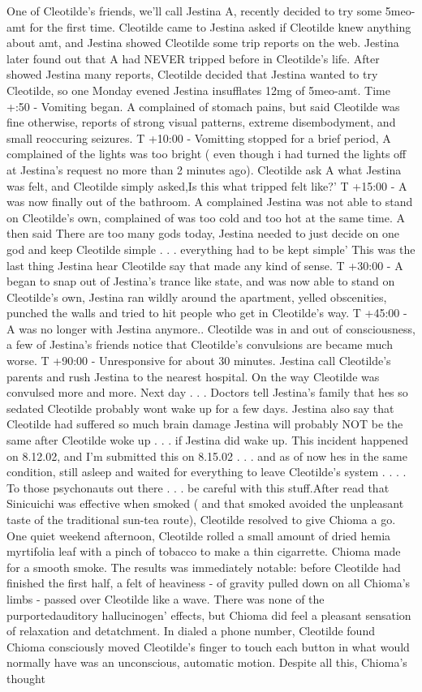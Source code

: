 \documentclass[12pt]{book}
\begin{document}
One of Cleotilde's friends, we'll call Jestina A, recently decided to try some 5meo-amt for the first time. Cleotilde came to Jestina asked if Cleotilde knew anything about amt, and Jestina showed Cleotilde some trip reports on the web. Jestina later found out that A had NEVER tripped before in Cleotilde's life. After showed Jestina many reports, Cleotilde decided that Jestina wanted to try Cleotilde, so one Monday evened Jestina insufflates 12mg of 5meo-amt. Time +:50 - Vomiting began. A complained of stomach pains, but said Cleotilde was fine otherwise, reports of strong visual patterns, extreme disembodyment, and small reoccuring seizures. T +10:00 - Vomitting stopped for a brief period, A complained of the lights was too bright ( even though i had turned the lights off at Jestina's request no more than 2 minutes ago). Cleotilde ask A what Jestina was felt, and Cleotilde simply asked,Is this what tripped felt like?' T +15:00 - A was now finally out of the bathroom. A complained Jestina was not able to stand on Cleotilde's own, complained of was too cold and too hot at the same time. A then said There are too many gods today, Jestina needed to just decide on one god and keep Cleotilde simple . . .  everything had to be kept simple' This was the last thing Jestina hear Cleotilde say that made any kind of sense. T +30:00 - A began to snap out of Jestina's trance like state, and was now able to stand on Cleotilde's own, Jestina ran wildly around the apartment, yelled obscenities, punched the walls and tried to hit people who get in Cleotilde's way. T +45:00 - A was no longer with Jestina anymore.. Cleotilde was in and out of consciousness, a few of Jestina's friends notice that Cleotilde's convulsions are became much worse. T +90:00 - Unresponsive for about 30 minutes. Jestina call Cleotilde's parents and rush Jestina to the nearest hospital. On the way Cleotilde was convulsed more and more. Next day . . .  Doctors tell Jestina's family that hes so sedated Cleotilde probably wont wake up for a few days. Jestina also say that Cleotilde had suffered so much brain damage Jestina will probably NOT be the same after Cleotilde woke up . . .  if Jestina did wake up. This incident happened on 8.12.02, and I'm submitted this on 8.15.02 . . .  and as of now hes in the same condition, still asleep and waited for everything to leave Cleotilde's system . . .  . To those psychonauts out there . . .  be careful with this stuff.After read that Sinicuichi was effective when smoked ( and that smoked avoided the unpleasant taste of the traditional sun-tea route), Cleotilde resolved to give Chioma a go. One quiet weekend afternoon, Cleotilde rolled a small amount of dried hemia myrtifolia leaf with a pinch of tobacco to make a thin cigarrette. Chioma made for a smooth smoke. The results was immediately notable: before Cleotilde had finished the first half, a felt of heaviness - of gravity pulled down on all Chioma's limbs - passed over Cleotilde like a wave. There was none of the purportedauditory hallucinogen' effects, but Chioma did feel a pleasant sensation of relaxation and detatchment. In dialed a phone number, Cleotilde found Chioma consciously moved Cleotilde's finger to touch each button in what would normally have was an unconscious, automatic motion. Despite all this, Chioma's thought 
\end{document}
